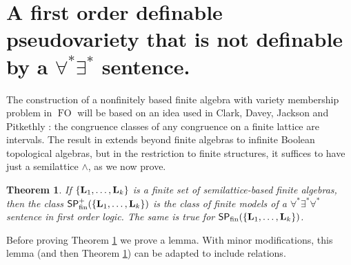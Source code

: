 \documentclass[reqno]{amsart}
\theoremstyle{plain}
\newtheorem{thm}{Theorem}[section]
\theoremstyle{definition}
\newcommand{\FO}{\operatorname{FO}}
\begin{document}
 

\section{A first order definable pseudovariety that is not definable by a $\forall^*\exists^*$ sentence.}\label{sec:FO}
The construction of a nonfinitely based finite algebra with variety membership problem in $\FO$ will be based on an idea used in Clark, Davey, Jackson and Pitkethly \cite[Theorem 4.2]{CDJP}: the congruence classes of any congruence on a finite lattice are intervals. The result in \cite{CDJP} extends beyond finite algebras to infinite Boolean topological algebras, but in the restriction to finite structures, it suffices to have just a semilattice $\wedge$, as we now prove.  
\begin{thm}\label{thm:FOq}
If $\{{\bf L}_1,\dots,{\bf L}_k\}$ is a finite set of semilattice-based finite algebras, then the class $\mathsf{SP}_{\rm fin}^+(\{{\bf L}_1,\dots,{\bf L}_k\})$ is the class of finite models of a $\forall^*\exists^*\forall^*$ sentence in first order logic.  The same is true for $\mathsf{SP}_{\rm fin}(\{{\bf L}_1,\dots,{\bf L}_k\})$.
\end{thm}
Before proving Theorem \ref{thm:FOq} we prove a lemma.  With minor modifications, this lemma (and then Theorem \ref{thm:FOq}) can  be adapted to include relations.
\end{document}
